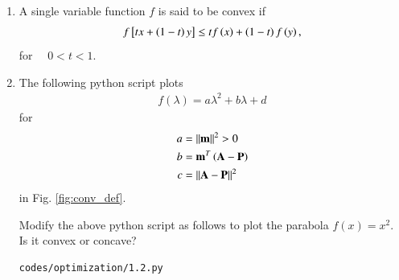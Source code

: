\renewcommand{\theequation}{\theenumi}

\begin{enumerate}[label=\arabic*.,ref=\thesection.\theenumi]

\item A single variable function $f$ is said to be convex if
%
\begin{align}
\label{eq:convex_def}
f{}\left[t x + \left(1-t\right)y\right] \leq t f\left(x\right) + \left(1-t\right)f\left(y\right), 
\end{align}
%
for $\quad 0 < t < 1$.


\item
The following python script plots 
%
\begin{align}
f(\lambda) = a\lambda^2 + b\lambda + d
\end{align}
%
for 
\begin{align}
a &= \left\lVert\mathbf{m}\right\rVert^2 > 0
\\
b &= \mathbf{m}^T\left(\mathbf{A} -\mathbf{P}\right) 
\\
c &= \left\lVert\mathbf{A} -\mathbf{P}\right\rVert^2
\end{align}
in Fig. \ref{fig:conv_def}.

Modify the above python script as follows to plot the parabola $f(x) = x^2$. Is it convex or concave?

\begin{lstlisting}
codes/optimization/1.2.py
\end{lstlisting}
%


\end{enumerate}
